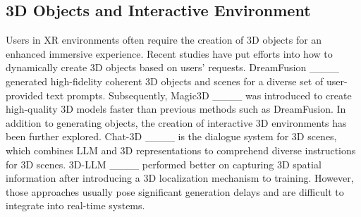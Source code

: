 \subsection{3D Objects and Interactive Environment}
Users in XR environments often require the creation of 3D objects for an enhanced immersive experience. Recent studies have put efforts into how to dynamically create 3D objects based on users' requests.
DreamFusion ____ generated high-fidelity coherent 3D objects and scenes for a diverse set of user-provided text prompts. Subsequently, Magic3D ____ was introduced to create high-quality 3D models faster than previous methods such as DreamFusion. In addition to generating objects, the creation of interactive 3D environments has been further explored. Chat-3D ____ is the dialogue system for 3D scenes, which combines LLM and 3D representations to comprehend diverse instructions for 3D scenes. 3D-LLM ____ performed better on capturing 3D spatial information after introducing a 3D localization mechanism to training. However, those approaches usually pose significant generation delays and are difficult to integrate into real-time systems.